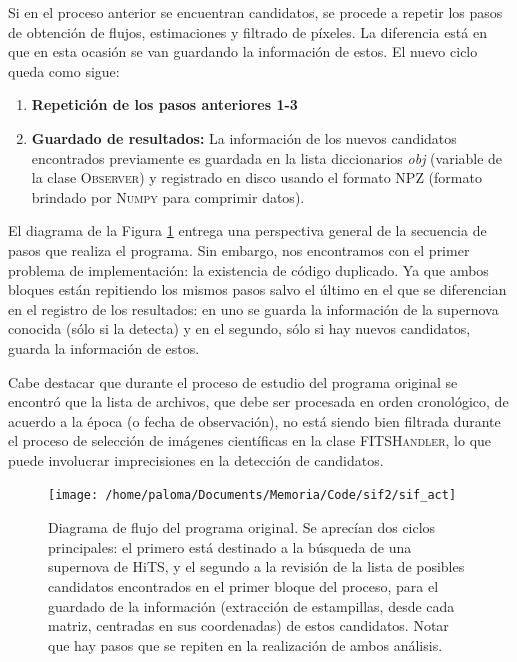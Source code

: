 Si en el proceso anterior se encuentran candidatos, se procede a repetir los pasos de obtenci\'on de flujos, estimaciones y filtrado de p\'ixeles. La diferencia est\'a en que en esta ocasi\'on se van guardando la informaci\'on de estos. El nuevo ciclo queda como sigue:

\begin{enumerate}

\item \textbf{Repetici\'on de los pasos anteriores 1-3}
\item \textbf{Guardado de resultados:} La informaci\'on de los nuevos candidatos encontrados previamente es guardada en la lista diccionarios \textit{obj} (variable de la clase \textsc{Observer}) y registrado en disco usando el formato NPZ (formato brindado por \textsc{Numpy} para comprimir datos).
\end{enumerate}


El diagrama de la Figura \ref{fig:des_sif} entrega una perspectiva general de la secuencia de pasos que realiza el programa. Sin embargo, nos encontramos con el primer problema de implementaci\'on: la existencia de c\'odigo duplicado. Ya que ambos bloques est\'an repitiendo los mismos pasos salvo el \'ultimo en el que se diferencian en el registro de los resultados: en uno se guarda la informaci\'on de la supernova conocida (s\'olo si la detecta) y en el segundo, s\'olo si hay nuevos candidatos, guarda la informaci\'on de estos.
\bigskip

Cabe destacar que durante el proceso de estudio del programa original se encontr\'o que la lista de archivos, que debe ser procesada en orden cronol\'ogico, de acuerdo a la \'epoca (o fecha de observaci\'on), no est\'a siendo bien filtrada durante el proceso de selecci\'on de im\'agenes cient\'ificas en la clase \textsc{FITSHandler}, lo que puede involucrar imprecisiones en la detecci\'on de candidatos.
\bigskip


\begin{figure}[h!]
\centering
\texttt{[image: /home/paloma/Documents/Memoria/Code/sif2/sif\_act]}
\caption{Diagrama de flujo del programa original. Se aprec\'ian dos ciclos principales: el primero est\'a destinado a la b\'usqueda de una supernova de HiTS, y el segundo a la revisi\'on de la lista de posibles candidatos encontrados en el primer bloque del proceso, para el guardado de la informaci\'on (extracci\'on de estampillas, desde cada matriz, centradas en sus coordenadas) de estos candidatos. Notar que hay pasos que se repiten en la realizaci\'on de ambos an\'alisis.}
\label{fig:des_sif}
\end{figure}

